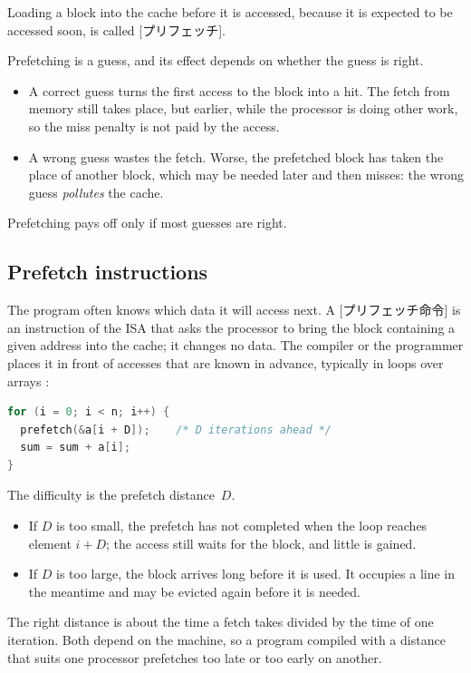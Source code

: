 \documentclass[../main.tex]{subfiles}
\begin{document}
\begin{definition}[Prefetching]
  Loading a block into the cache before it is accessed, because it is
  expected to be accessed soon, is called [プリフェッチ].
\end{definition}

Prefetching is a guess, and its effect depends on whether the guess is right.
\begin{itemize}
  \item A correct guess turns the first access to the block into a hit.  The
    fetch from memory still takes place, but earlier, while the processor is
    doing other work, so the miss penalty is not paid by the access.
  \item A wrong guess wastes the fetch.  Worse, the prefetched block has taken
    the place of another block, which may be needed later and then misses: the
    wrong guess \emph{pollutes} the cache.
\end{itemize}
Prefetching pays off only if most guesses are right.

\subsection{Prefetch instructions}

The program often knows which data it will access next.  A
[プリフェッチ命令] is an instruction of the ISA
that asks the processor to bring the block containing a given address into
the cache; it changes no data.  The compiler or the programmer places it in
front of accesses that are known in advance, typically in loops over
arrays \cite{callahan1991}:
\begin{lstlisting}[language=C, numbers=none]
for (i = 0; i < n; i++) {
  prefetch(&a[i + D]);    /* D iterations ahead */
  sum = sum + a[i];
}
\end{lstlisting}
The difficulty is the prefetch distance~$D$.
\begin{itemize}
  \item If $D$ is too small, the prefetch has not completed when the loop
    reaches element $i+D$; the access still waits for the block, and little
    is gained.
  \item If $D$ is too large, the block arrives long before it is used.  It
    occupies a line in the meantime and may be evicted again before it is
    needed.
\end{itemize}
The right distance is about the time a fetch takes divided by the time of one
iteration.  Both depend on the machine, so a program compiled with a
distance that suits one processor prefetches too late or too early on
another.
\end{document}
